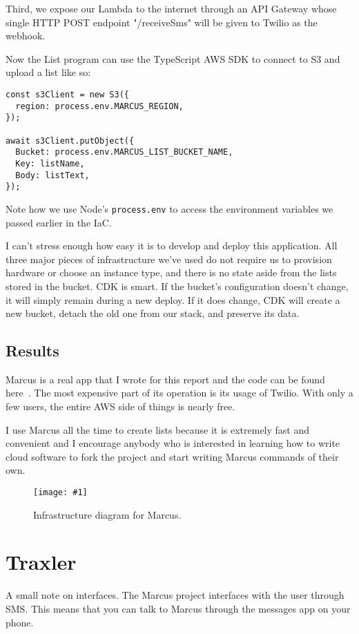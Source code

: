 \documentclass{article}
\newcommand{\screenshot}[2]{
  \begin{figure}[h]
    \texttt{[image: \#1]}
    \caption*{#2}
  \end{figure}
}
\begin{document}
Third, we expose our Lambda to the internet through an API Gateway whose single HTTP POST endpoint "/receiveSms" will be given to Twilio as the webhook.

Now the List program can use the TypeScript AWS SDK to connect to S3 and upload a list like so:

\begin{verbatim}
const s3Client = new S3({
  region: process.env.MARCUS_REGION,
});

await s3Client.putObject({
  Bucket: process.env.MARCUS_LIST_BUCKET_NAME,
  Key: listName,
  Body: listText,
});
\end{verbatim}

Note how we use Node's \texttt{process.env} to access the environment variables we passed earlier in the IaC.

I can't stress enough how easy it is to develop and deploy this application.
All three major pieces of infrastructure we've used do not require us to provision hardware or choose an instance type, and there is no state aside from the lists stored in the bucket.
CDK is smart.
If the bucket's configuration doesn't change, it will simply remain during a new deploy.
If it does change, CDK will create a new bucket, detach the old one from our stack, and preserve its data.

\subsection{Results}

Marcus is a real app that I wrote for this report and the code can be found here~\cite{marcus}.
The most expensive part of its operation is its usage of Twilio.
With only a few users, the entire AWS side of things is nearly free.

I use Marcus all the time to create lists because it is extremely fast and convenient and I encourage anybody who is interested in learning how to write cloud software to fork the project and start writing Marcus commands of their own.

\screenshot{marcus-infra}{Infrastructure diagram for Marcus.}

\section{Traxler}

A small note on interfaces.
The Marcus project interfaces with the user through SMS.
This means that you can talk to Marcus through the messages app on your phone.
\end{document}
